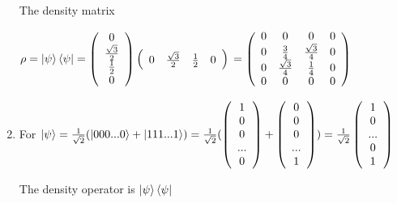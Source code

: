 \documentclass{article}
\begin{document}
\begin{enumerate}
          The density matrix

          $\rho=\ket{\psi}\bra{\psi}=\left(\begin{array}{c}
                      0 \\\frac{\sqrt{3}}{2}\\\frac{1}{2}\\0
                  \end{array}\right)\left(\begin{array}{cccc}
                      0 & \frac{\sqrt{3}}{2} & \frac{1}{2} & 0
                  \end{array}\right)
              \\=\left(\begin{array}{cccc}
                      0 & 0                  & 0                  & 0 \\
                      0 & \frac{3}{4}        & \frac{\sqrt{3}}{4} & 0 \\
                      0 & \frac{\sqrt{3}}{4} & \frac{1}{4}        & 0 \\
                      0 & 0                  & 0                  & 0 \\
                  \end{array}\right)$


    \item For $\ket{\psi}=\frac{1}{\sqrt{2}}(\ket{000...0}+\ket{111...1})=\frac{1}{\sqrt{2}}(\left(\begin{array}{c}1\\0\\0\\...\\0\end{array}\right)+\left(\begin{array}{c}0\\0\\0\\...\\1\end{array}\right))=\frac{1}{\sqrt{2}}\left(\begin{array}{c}1\\0\\...\\0\\1\end{array}\right)$



          The density operator is $\ket{\psi}\bra{\psi}$


\end{enumerate}
\end{document}
